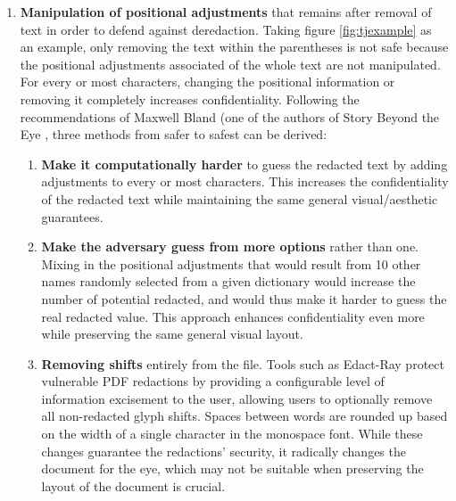 \begin{enumerate}
    \item \label{posadj} \textbf{Manipulation of positional adjustments} that remains after removal of text in order to defend against deredaction. Taking figure \ref{fig:tjexample} as an example, only removing the text within the parentheses is not safe because the positional adjustments associated of the whole text are not manipulated. For every or most characters, changing the positional information or removing it completely increases confidentiality. Following the recommendations of Maxwell Bland (one of the authors of Story Beyond the Eye \cite{bland2022story}, three methods from safer to safest can be derived:
        \begin{enumerate}
            \item \textbf{Make it computationally harder} to guess the redacted text by adding adjustments to every or most characters. This increases the confidentiality of the redacted text while maintaining the same general visual/aesthetic guarantees. 
            \item \label{b} \textbf{Make the adversary guess from more options} rather than one. Mixing in the positional adjustments that would result from 10 other names randomly selected from a given dictionary would increase the number of potential redacted, and would thus make it harder to guess the real redacted value. This approach enhances confidentiality even more while preserving the same general visual layout.
            \item \label{c} \textbf{Removing shifts} entirely from the file. Tools such as Edact-Ray protect vulnerable PDF redactions by providing a configurable level of information excisement to the user, allowing users to optionally remove all non-redacted glyph shifts. Spaces between words are rounded up based on the width of a single character in the monospace font. While these changes guarantee the redactions’ security, it radically changes the document for the eye, which may not be suitable when preserving the layout of the document is crucial.
        \end{enumerate}


\end{enumerate}
